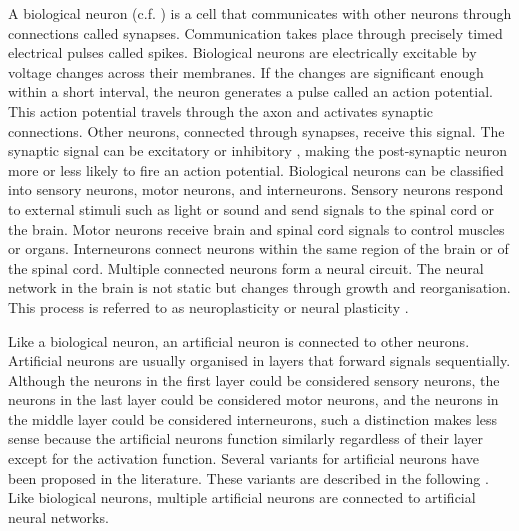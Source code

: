 A biological neuron (c.f. ) is a cell that communicates with other neurons through connections called synapses.
Communication takes place through precisely timed electrical pulses called spikes.
Biological neurons are electrically excitable by voltage changes across their membranes.
If the changes are significant enough within a short interval, the neuron generates a pulse called an action potential.
This action potential travels through the axon and activates synaptic connections.
Other neurons, connected through synapses, receive this signal.
The synaptic signal can be excitatory  or inhibitory , making the post-synaptic neuron more or less likely to fire an action potential.
Biological neurons can be classified into sensory neurons, motor neurons, and interneurons.
Sensory neurons respond to external stimuli such as light or sound and send signals to the spinal cord or the brain.
Motor neurons receive brain and spinal cord signals to control muscles or organs.
Interneurons connect neurons within the same region of the brain or of the spinal cord.
Multiple connected neurons form a neural circuit.
The neural network in the brain is not static but changes through growth and reorganisation.
This process is referred to as neuroplasticity or neural plasticity .

Like a biological neuron, an artificial neuron is connected to other neurons.
Artificial neurons are usually organised in layers that forward signals sequentially.
Although the neurons in the first layer could be considered sensory neurons, the neurons in the last layer could be considered motor neurons, and the neurons in the middle layer could be considered interneurons, such a distinction makes less sense because the artificial neurons function similarly regardless of their layer except for the activation function.
Several variants for artificial neurons have been proposed in the literature. These variants are described in the following  .
Like biological neurons, multiple artificial neurons are connected to artificial neural networks.


